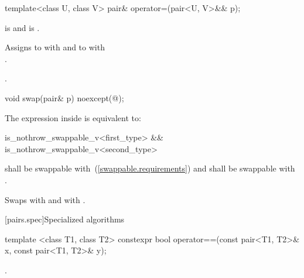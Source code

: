 \begin{itemdecl}
template<class U, class V> pair& operator=(pair<U, V>&& p);
\end{itemdecl}

\begin{itemdescr}
\pnum
\requires {} is 
and  is .

\pnum
\effects
Assigns to  with 
and to  with\\ .

\pnum
\returns {}.
\end{itemdescr}

\begin{itemdecl}
void swap(pair& p) noexcept(@\seebelow@);
\end{itemdecl}

\begin{itemdescr}
\pnum
\remarks The expression inside  is equivalent to:

\begin{codeblock}
is_nothrow_swappable_v<first_type> &&
is_nothrow_swappable_v<second_type>
\end{codeblock}

\pnum
\requires
{} shall be swappable with~(\ref{swappable.requirements})
 and  shall be swappable with .

\pnum
\effects Swaps
 with  and
 with .
\end{itemdescr}

[pairs.spec]{Specialized algorithms}

%
\begin{itemdecl}
template <class T1, class T2>
  constexpr bool operator==(const pair<T1, T2>& x, const pair<T1, T2>& y);
\end{itemdecl}

\begin{itemdescr}
\pnum
\returns
{}.
\end{itemdescr}

